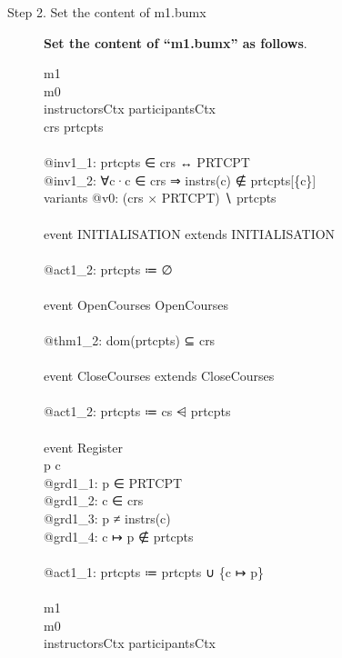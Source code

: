 \begin{description}
\item[Step 2. Set the content of m1.bumx] \textbf{Set the content of ``m1.bumx'' as follows}.
  \begin{center}
    \begin{Bcode}
      \Bmachine{} m1\\
      \Brefines{} m0\\
      \Bsees{} instructorsCtx participantsCtx \\
      \Bvariables{} crs prtcpts \\
      \Binvariants\\
      @inv1_1: prtcpts ∈ crs ↔ PRTCPT\\
      @inv1_2: ∀c·c ∈ crs ⇒ instrs(c) ∉ prtcpts[\{c\}]\\
      variants @v0: (crs × PRTCPT) ∖ prtcpts\\
      \Bevents\\
      event INITIALISATION extends INITIALISATION\\
      \Bthen\\
      @act1_2: prtcpts ≔ ∅\\
      \Bend\\
      event OpenCourses \Brefines{} OpenCourses\\
      \Bwhere\\
      \Btheorem{} @thm1_2: dom(prtcpts) ⊆ crs\\
      \Bend\\
      \Banticipated{} event CloseCourses extends CloseCourses\\
      \Bthen\\
      @act1_2: prtcpts ≔ cs ⩤ prtcpts\\
      \Bend\\
      \Bconvergent event Register \\
      \Bany{} p c \Bwhere \\
      @grd1_1: p ∈ PRTCPT\\
      @grd1_2: c ∈ crs\\
      @grd1_3: p ≠ instrs(c)\\
      @grd1_4: c ↦ p ∉ prtcpts\\
      \Bthen\\
      @act1_1: prtcpts ≔ prtcpts ∪ \{c ↦ p\}\\
      \Bend\\
      \Bend
      \else
      \Bmachine{} m1\\
      \Brefines{} m0\\
      \Bsees{} instructorsCtx participantsCtx \\

\end{Bcode}
\end{center}
\end{description}
